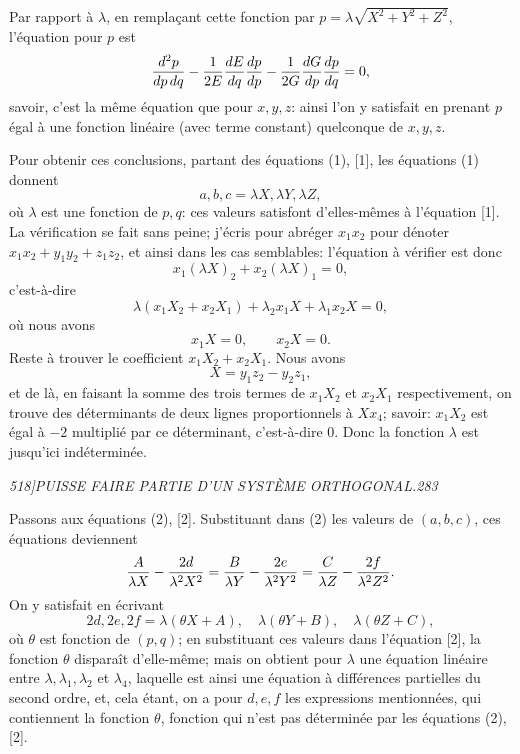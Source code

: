 \documentclass[11pt]{article}
\newcommand{\phead}[3]{\noindent\textit{#1\hfill #2\hfill #3}\par\medskip}
\begin{document}
Par rapport \`a $\lambda$, en rempla\c{c}ant cette fonction par
$p=\lambda\sqrt{X^2+Y^2+Z^2}$, l'\'equation pour $p$ est
\[
{d^2p\over dp\,dq}-{1\over2E}{dE\over dq}{dp\over dp}
-{1\over2G}{dG\over dp}{dp\over dq}=0,
\]
savoir, c'est la m\^eme \'equation que pour $x,y,z$: ainsi l'on y satisfait en prenant
$p$ \'egal \`a une fonction lin\'eaire (avec terme constant) quelconque de $x,y,z$.

Pour obtenir ces conclusions, partant des \'equations (1), [1], les \'equations (1) donnent
\[
a,b,c=\lambda X,\lambda Y,\lambda Z,
\]
o\`u $\lambda$ est une fonction de $p,q$: ces valeurs satisfont d'elles-m\^emes \`a
l'\'equation [1]. La v\'erification se fait sans peine; j'\'ecris pour abr\'eger $x_1x_2$ pour
d\'enoter $x_1x_2+y_1y_2+z_1z_2$, et ainsi dans les cas semblables: l'\'equation \`a
v\'erifier est donc
\[
x_1(\lambda X)_2+x_2(\lambda X)_1=0,
\]
c'est-\`a-dire
\[
\lambda(x_1X_2+x_2X_1)+\lambda_2x_1X+\lambda_1x_2X=0,
\]
o\`u nous avons
\[
x_1X=0,\qquad x_2X=0.
\]
Reste \`a trouver le coefficient $x_1X_2+x_2X_1$. Nous avons
\[
X=y_1z_2-y_2z_1,
\]
et de l\`a, en faisant la somme des trois termes de $x_1X_2$ et $x_2X_1$ respectivement,
on trouve des d\'eterminants de deux lignes proportionnels \`a $Xx_4$; savoir:
$x_1X_2$ est \'egal \`a $-2$ multipli\'e par ce d\'eterminant, c'est-\`a-dire $0$. Donc la
fonction $\lambda$ est jusqu'ici ind\'etermin\'ee.

\clearpage

\phead{518]}{PUISSE FAIRE PARTIE D'UN SYST\`EME ORTHOGONAL.}{283}

Passons aux \'equations (2), [2]. Substituant dans (2) les valeurs de $(a,b,c)$, ces
\'equations deviennent
\[
{A\over\lambda X}-{2d\over\lambda^2 X^2}
={B\over\lambda Y}-{2e\over\lambda^2 Y^2}
={C\over\lambda Z}-{2f\over\lambda^2 Z^2}.
\]
On y satisfait en \'ecrivant
\[
2d,2e,2f=\lambda(\theta X+A),\quad \lambda(\theta Y+B),\quad
\lambda(\theta Z+C),
\]
o\`u $\theta$ est fonction de $(p,q)$; en substituant ces valeurs dans l'\'equation [2], la
fonction $\theta$ dispara\^it d'elle-m\^eme; mais on obtient pour $\lambda$ une \'equation
lin\'eaire entre $\lambda,\lambda_1,\lambda_2$ et $\lambda_4$, laquelle est ainsi une \'equation
\`a diff\'erences partielles du second ordre, et, cela \'etant, on a pour $d,e,f$ les
expressions mentionn\'ees, qui contiennent la fonction $\theta$, fonction qui n'est pas
d\'etermin\'ee par les \'equations (2), [2].
\end{document}

